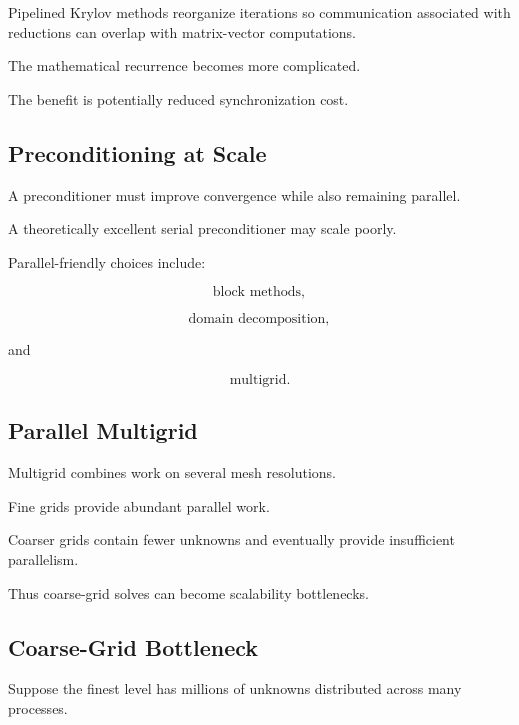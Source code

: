 Pipelined Krylov methods reorganize iterations so communication associated
with reductions can overlap with matrix-vector computations.

The mathematical recurrence becomes more complicated.

The benefit is potentially reduced synchronization cost.

\subsection{Preconditioning at Scale}
\label{subsec:parallel-preconditioning}

A preconditioner must improve convergence while also remaining parallel.

A theoretically excellent serial preconditioner may scale poorly.

Parallel-friendly choices include:

\[
\boxed{
\text{block methods},
}
\]

\[
\boxed{
\text{domain decomposition},
}
\]

and

\[
\boxed{
\text{multigrid}.
}
\]

\subsection{Parallel Multigrid}
\label{subsec:parallel-multigrid}

Multigrid combines work on several mesh resolutions.

Fine grids provide abundant parallel work.

Coarser grids contain fewer unknowns and eventually provide insufficient
parallelism.

Thus coarse-grid solves can become scalability bottlenecks.

\subsection{Coarse-Grid Bottleneck}
\label{subsec:multigrid-coarse-grid-bottleneck}

Suppose the finest level has millions of unknowns distributed across many
processes.

